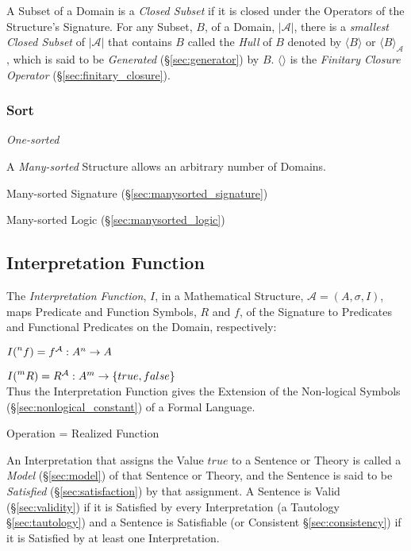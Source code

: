 A Subset of a Domain is a \emph{Closed Subset} if it is closed under
the Operators of the Structure's Signature. For any Subset, $B$, of a
Domain, $|\mathcal{A}|$, there is a \emph{smallest Closed Subset} of
$|\mathcal{A}|$ that contains $B$ called the \emph{Hull} of $B$
denoted by $\langle B \rangle$ or $\langle B \rangle_{\mathcal{A}}$,
which is said to be \emph{Generated} (\S\ref{sec:generator}) by $B$.
$\langle \rangle$ is the \emph{Finitary Closure Operator}
(\S\ref{sec:finitary_closure}).



\subsubsection{Sort}\label{sec:sort}

\emph{One-sorted}

A \emph{Many-sorted} Structure allows an arbitrary number of Domains.

Many-sorted Signature (\S\ref{sec:manysorted_signature})

Many-sorted Logic (\S\ref{sec:manysorted_logic})



\subsection{Interpretation Function}
\label{sec:interpretation_function}

The \emph{Interpretation Function}, $I$, in a Mathematical Structure,
$\mathcal{A} = (A, \sigma, I)$, maps Predicate and Function Symbols,
$R$ and $f$, of the Signature to Predicates and Functional Predicates
on the Domain, respectively:

$I (\prescript{n}{}{f}) = f^{\mathcal{A}} : A^n \rightarrow A$

$I (\prescript{m}{}{R}) = R^{\mathcal{A}} : A^m \rightarrow \{true,
false\}$ \\
Thus the Interpretation Function gives the Extension of
the Non-logical Symbols (\S\ref{sec:nonlogical_constant}) of a Formal
Language.

Operation = Realized Function

An Interpretation that assigns the Value $true$ to a Sentence or
Theory is called a \emph{Model} (\S\ref{sec:model}) of that Sentence
or Theory, and the Sentence is said to be \emph{Satisfied}
(\S\ref{sec:satisfaction}) by that assignment. A Sentence is Valid
(\S\ref{sec:validity}) if it is Satisfied by every Interpretation (a
Tautology \S\ref{sec:tautology}) and a Sentence is Satisfiable (or
Consistent \S\ref{sec:consistency}) if it is Satisfied by at least one
Interpretation.

